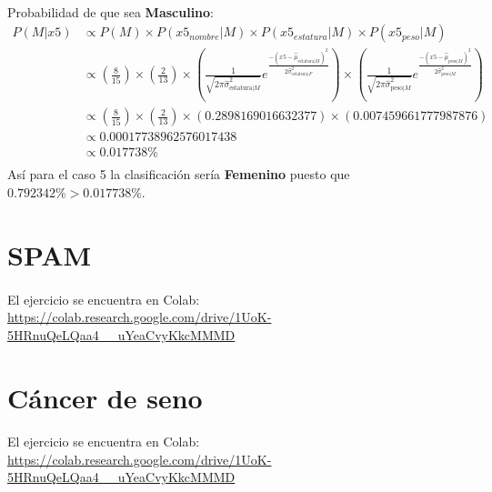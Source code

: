\documentclass[12pt]{article}
\begin{document}
\paragraph{}Probabilidad de que sea \textbf{Masculino}:\\
\begin{equation}
\begin{split}
P(M|x5) &\propto P(M) \times P(x5_{nombre}|M) \times P(x5_{estatura}|M) \times P(x5_{peso}|M) \\
&\propto (\frac{8}{15}) \times (\frac{2}{13}) \times (\frac{1}{\sqrt{2\pi\hat{\sigma}_{\text{estatura}|M}^2}}e^{\frac{-(x5 - \hat{\mu}_{\text{estatura}|M})^2}{2\hat{\sigma}_{\text{estatura}|F}^2}}) \times (\frac{1}{\sqrt{2\pi\hat{\sigma}_{\text{peso}|M}^2}}e^{\frac{-(x5 - \hat{\mu}_{\text{peso}|M})^2}{2\hat{\sigma}_{\text{peso}|M}^2}}) \\
&\propto (\frac{8}{15}) \times (\frac{2}{13}) \times (0.2898169016632377) \times (0.007459661777987876) \\
&\propto 0.00017738962576017438 \\
&\propto 0.017738 \% \\
\end{split}
\end{equation}
Así para el caso 5 la clasificación sería \textbf{Femenino} puesto que $0.792342\% > 0.017738\%$.\\
\clearpage
\pagebreak
\section{SPAM}
\paragraph{}El ejercicio se encuentra en Colab:\\
\url{https://colab.research.google.com/drive/1UoK-5HRnuQeLQaa4__uYeaCvyKkcMMMD}
\section{Cáncer de seno}
\paragraph{}El ejercicio se encuentra en Colab:\\
\url{https://colab.research.google.com/drive/1UoK-5HRnuQeLQaa4__uYeaCvyKkcMMMD}  
\end{document}
